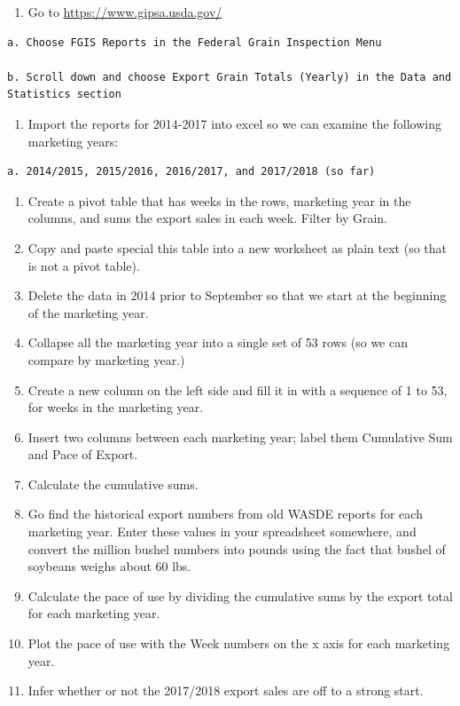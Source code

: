 \documentclass[
  letterpaper,
  DIV=11,
  numbers=noendperiod]{scrreprt}
\providecommand{\tightlist}{%
  \setlength{\itemsep}{0pt}\setlength{\parskip}{0pt}}\usepackage{longtable,booktabs,array}
\begin{document}
\begin{enumerate}
\def\labelenumi{\arabic{enumi}.}
\tightlist
\item
  Go to \url{https://www.gipsa.usda.gov/}
\end{enumerate}

\begin{verbatim}
a. Choose FGIS Reports in the Federal Grain Inspection Menu  

b. Scroll down and choose Export Grain Totals (Yearly) in the Data and Statistics section  
\end{verbatim}

\begin{enumerate}
\def\labelenumi{\arabic{enumi}.}
\setcounter{enumi}{1}
\tightlist
\item
  Import the reports for 2014-2017 into excel so we can examine the
  following marketing years:
\end{enumerate}

\begin{verbatim}
a. 2014/2015, 2015/2016, 2016/2017, and 2017/2018 (so far)  
\end{verbatim}

\begin{enumerate}
\def\labelenumi{\arabic{enumi}.}
\setcounter{enumi}{2}
\item
  Create a pivot table that has weeks in the rows, marketing year in the
  columns, and sums the export sales in each week. Filter by Grain.
\item
  Copy and paste special this table into a new worksheet as plain text
  (so that is not a pivot table).
\item
  Delete the data in 2014 prior to September so that we start at the
  beginning of the marketing year.
\item
  Collapse all the marketing year into a single set of 53 rows (so we
  can compare by marketing year.)
\item
  Create a new column on the left side and fill it in with a sequence of
  1 to 53, for weeks in the marketing year.
\item
  Insert two columns between each marketing year; label them Cumulative
  Sum and Pace of Export.
\item
  Calculate the cumulative sums.
\item
  Go find the historical export numbers from old WASDE reports for each
  marketing year. Enter these values in your spreadsheet somewhere, and
  convert the million bushel numbers into pounds using the fact that
  bushel of soybeans weighs about 60 lbs.
\item
  Calculate the pace of use by dividing the cumulative sums by the
  export total for each marketing year.
\item
  Plot the pace of use with the Week numbers on the x axis for each
  marketing year.
\item
  Infer whether or not the 2017/2018 export sales are off to a strong
  start.
\end{enumerate}
\end{document}
